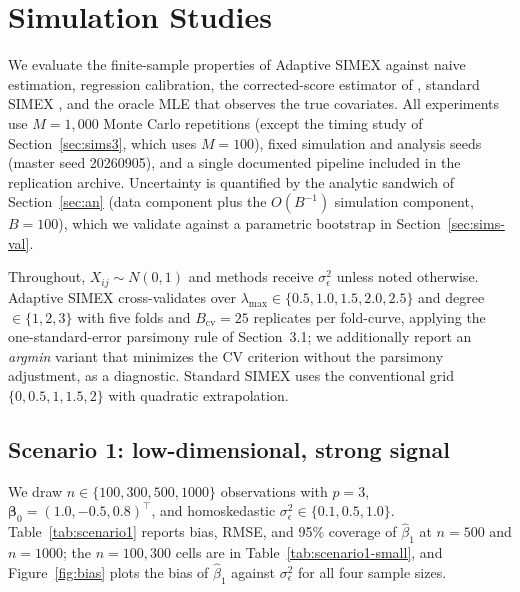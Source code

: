 
\section{Simulation Studies}\label{sec:sims}

We evaluate the finite-sample properties of Adaptive SIMEX against
naive estimation, regression calibration, the corrected-score estimator
of \citealt{nakamura1990}, standard SIMEX \citep{cook1994}, and the
oracle MLE that observes the true covariates. All experiments use
$M=1{,}000$ Monte Carlo repetitions (except the timing study of
Section~\ref{sec:sims3}, which uses $M=100$), fixed simulation and
analysis seeds (master seed 20260905), and a single documented pipeline
included in the replication archive. Uncertainty is quantified by the
analytic sandwich of Section~\ref{sec:an} (data component plus the
$O(B^{-1})$ simulation component, $B=100$), which we validate against a
parametric bootstrap in Section~\ref{sec:sims-val}.

Throughout, $X_{ij}\sim N(0,1)$ and methods receive
$\sigma^2_{\epsilon}$ unless noted otherwise. Adaptive SIMEX
cross-validates over $\lambda_{\max}\in\{0.5,1.0,1.5,2.0,2.5\}$ and
degree $\in\{1,2,3\}$ with five folds and $B_{\mathrm{cv}}=25$
replicates per fold-curve, applying the one-standard-error parsimony
rule of Section~3.1; we additionally report an \emph{argmin} variant
that minimizes the CV criterion without the parsimony adjustment, as a
diagnostic. Standard SIMEX uses the conventional grid
$\{0,0.5,1,1.5,2\}$ with quadratic extrapolation.

\subsection{Scenario 1: low-dimensional, strong signal}
\label{sec:sims1}

We draw $n\in\{100,300,500,1000\}$ observations with $p=3$,
$\bm\beta_0=(1.0,-0.5,0.8)^\top$, and homoskedastic
$\sigma^2_\epsilon\in\{0.1,0.5,1.0\}$. Table~\ref{tab:scenario1}
reports bias, RMSE, and 95\% coverage of $\hat\beta_1$ at $n=500$ and
$n=1000$; the $n=100,300$ cells are in Table~\ref{tab:scenario1-small},
and Figure~\ref{fig:bias} plots the bias of $\hat\beta_1$ against
$\sigma^2_\epsilon$ for all four sample sizes.

